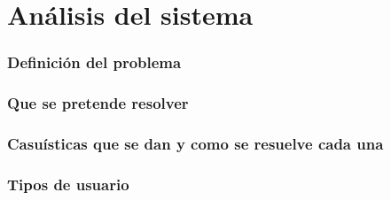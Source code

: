 \chapter {Análisis del sistema}

\subsection{Definición del problema}
\subsection{Que se pretende resolver}
\subsection{Casuísticas que se dan y como se resuelve cada una}
\subsection{Tipos de usuario}